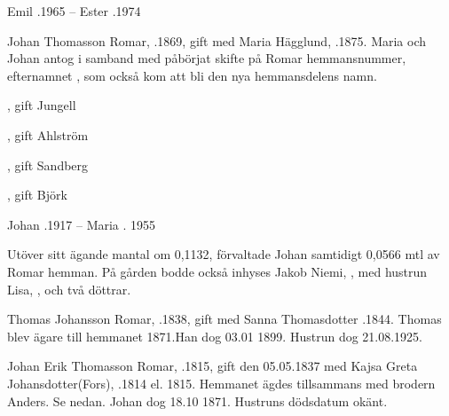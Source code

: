 Emil .1965  --  Ester .1974


Johan Thomasson Romar, .1869, gift med Maria Hägglund, .1875. Maria och Johan antog i samband med påbörjat skifte på Romar hemmansnummer, efternamnet , som också kom att bli den nya hemmansdelens namn.
\begin{jhchildren}
  \item {}
  \item {}, gift Jungell
  \item {}, gift Ahlström
  \item {}, gift Sandberg
  \item {}
  \item {}, gift Björk
\end{jhchildren}

Johan .1917  --  Maria . 1955

Utöver sitt ägande mantal om 0,1132, förvaltade Johan samtidigt 0,0566 mtl av Romar hemman. På gården bodde också inhyses Jakob Niemi, , med hustrun Lisa, , och två döttrar.


Thomas Johansson Romar, .1838, gift med Sanna Thomasdotter .1844.
Thomas blev ägare till hemmanet 1871.Han dog 03.01 1899. Hustrun dog 21.08.1925.
\begin{jhchildren}
  \item {}
  \item {}
  \item {}
  \item {}
  \item {}
  \item {}
  \item {}
  \item {}
\end{jhchildren}


Johan Erik Thomasson Romar, .1815, gift den 05.05.1837 med Kajsa Greta Johansdotter(Fors), .1814 el. 1815.
Hemmanet ägdes tillsammans med brodern Anders. Se nedan. Johan dog 18.10 1871. Hustruns dödsdatum okänt.
\begin{jhchildren}
  \item {}
  \item {}
  \item {}
  \item {}
\end{jhchildren}


